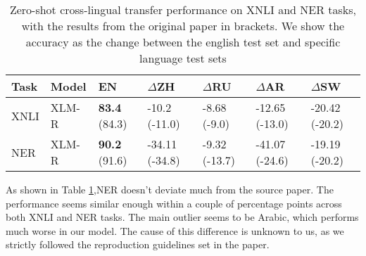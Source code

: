 \documentclass[times, utf8, seminar, english]{fer}
\begin{document}
\begin{table}[ht]
	\centering
	\resizebox{300pt}{!}
	{\begin{tabular}{lllllll}
		\cline{1-7}
		Task & Model & EN   & $\Delta$ZH     & $\Delta$RU    & $\Delta$AR     & $\Delta$SW     \\ \hline
		XNLI  & XLM-R     & \textbf{83.4} (84.3) & -10.2 (-11.0)  & -8.68 (-9.0) & -12.65 (-13.0) & -20.42 (-20.2) \\ \hline
		NER & XLM-R       & \textbf{90.2} (91.6) & -34.11 (-34.8)  & -9.32 (-13.7) & -41.07 (-24.6) & -19.19 (-20.2) \\ \hline
	\end{tabular}}
	\caption{Zero-shot cross-lingual transfer performance on XNLI and NER tasks, with the results from the original paper in brackets. We show the accuracy as the change between the english test set and specific language test sets}
	\label{tab:a}
\end{table}

As shown in Table \ref{tab:a},NER doesn't deviate much from the source paper. The performance seems similar enough within a couple of percentage points across both XNLI and NER tasks. The main outlier seems to be Arabic, which performs much worse in our model. The cause of this difference is unknown to us, as we strictly followed the reproduction guidelines set in the paper.
\end{document}
